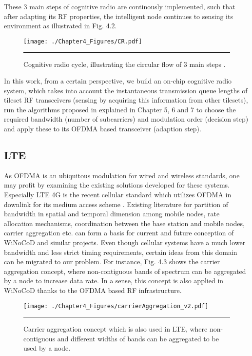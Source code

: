 These 3 main steps of cognitive radio are continously implemented, such that after adapting its RF properties, the intelligent node continues to sensing its environment as illustrated in Fig. 4.2.

\begin{figure}[htbp]
  \centering
    \texttt{[image: ./Chapter4\_Figures/CR.pdf]}
    \rule{35em}{0.5pt}
  \caption[Cognitive radio cycle, illustrating the circular flow of 3 main steps.]{Cognitive radio cycle, illustrating the circular flow of 3 main steps \cite{palicot2013radio}.} 
  \label{fig:Electron}
\end{figure}

In this work, from a certain perspective, we build an on-chip cognitive radio system, which takes into account the instantaneous transmission queue lengths of tileset RF transceivers (sensing by acquiring this information from other tilesets), run the algorithms proposed in explained in Chapter 5, 6 and 7 to choose the required bandwidth (number of subcarriers) and modulation order (decision step) and apply these to its OFDMA based transceiver (adaption step).

\subsection{LTE}

As OFDMA is an ubiquitous modulation for wired and wireless standards, one may profit by examining the existing solutions developed for these systems. Especially LTE 4G is the recent cellular standard which utilizes OFDMA in downlink for its medium access scheme \cite{zyren2007overview}. Existing literature for partition of bandwidth in spatial and temporal dimension among mobile nodes, rate allocation mechanisms, coordination between the base station and mobile nodes, carrier aggregation etc. can form a basis for current and future conception of WiNoCoD and similar projects. Even though cellular systems have a much lower bandwidth and less strict timing requirements, certain ideas from this domain can be migrated to our problem. For instance, Fig. 4.3 shows the carrier aggregation concept, where non-contiguous bands of spectrum can be aggregated by a node to increase data rate. In a sense, this concept is also applied in WiNoCoD thanks to the OFDMA based RF infrastructure. 


\begin{figure}[htbp]
  \centering
    \texttt{[image: ./Chapter4\_Figures/carrierAggregation\_v2.pdf]}
    \rule{35em}{0.5pt}
  \caption[Carrier aggregation concept which is also used in LTE, where non-contiguous and different widths of bands can be aggregated to be used by a node.]{Carrier aggregation concept which is also used in LTE, where non-contiguous and different widths of bands can be aggregated to be used by a node.} 
  \label{fig:Electron}
\end{figure}


